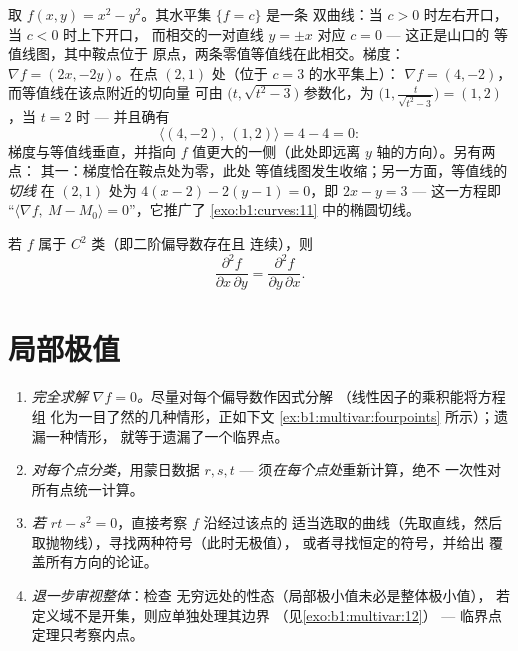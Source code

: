 \begin{example}[同一函数的等值线与梯度]
\label{ex:b1:multivar:levelcurves}
取 $f(x, y) = x^2 - y^2$。其水平集 $\{f = c\}$ 是一条
双曲线：当 $c > 0$ 时左右开口，当 $c < 0$ 时上下开口，
而相交的一对直线 $y = \pm x$ 对应 $c = 0$ --- 这正是山口的
等值线图，其中鞍点位于
原点，两条零值等值线在此相交。梯度：$\nabla
f = (2x, -2y)$。在点 $(2, 1)$ 处（位于 $c = 3$ 的水平集上）：
$\nabla f = (4, -2)$，而等值线在该点附近的切向量
可由 $\bigl(t,
\sqrt{t^2 - 3}\bigr)$ 参数化，为 $\bigl(1, \frac{t}{\sqrt{t^2 -
3}}\bigr) = (1, 2)$，当 $t = 2$ 时 --- 并且确有
\[
\langle (4, -2),\ (1, 2)\rangle = 4 - 4 = 0 :
\]
梯度与等值线垂直，并指向
$f$ 值更大的一侧（此处即远离 $y$ 轴的方向）。另有两点：
其一：梯度恰在鞍点处为零，此处
等值线图发生收缩；另一方面，等值线的 \emph{切线}
在 $(2,1)$ 处为 $4(x - 2) - 2(y - 1) = 0$，即 $2x -
y = 3$ --- 这一方程即 “$\langle \nabla f,\ M - M_0\rangle =
0$”，它推广了
\cref{exo:b1:curves:11} 中的椭圆切线。
\end{example}

\begin{theorem}[施瓦茨定理]\label{thm:b1:multivar:schwarz}
若 $f$ 属于 $C^2$ 类（即二阶偏导数存在且
连续），则
\[
\frac{\partial^2 f}{\partial x\,\partial y}
= \frac{\partial^2 f}{\partial y\,\partial x} .
\]
\end{theorem}
\admitted

\section{局部极值}

\begin{method}[有条理的极值研究]
\label{met:b1:multivar:extremamethod}
\begin{enumerate}
  \item \emph{完全求解 $\nabla f = 0$。}尽量对每个偏导数作因式分解
        （线性因子的乘积能将方程组
        化为一目了然的几种情形，正如下文
        \cref{ex:b1:multivar:fourpoints} 所示）；遗漏一种情形，
        就等于遗漏了一个临界点。
  \item \emph{对每个点分类}，用蒙日数据 $r, s,
        t$ --- 须\emph{在每个点处}重新计算，绝不
        一次性对所有点统一计算。
  \item \emph{若 $rt - s^2 = 0$}，直接考察 $f$ 沿经过该点的
        适当选取的曲线（先取直线，然后
        取抛物线），寻找两种符号（此时无极值），
        或者寻找恒定的符号，并给出
        覆盖所有方向的论证。
  \item \emph{退一步审视整体}：检查
        无穷远处的性态（局部极小值未必是整体极小值），
        若定义域不是开集，则应单独处理其边界
        （见\cref{exo:b1:multivar:12}） --- 临界点
        定理只考察内点。
\end{enumerate}
\end{method}

